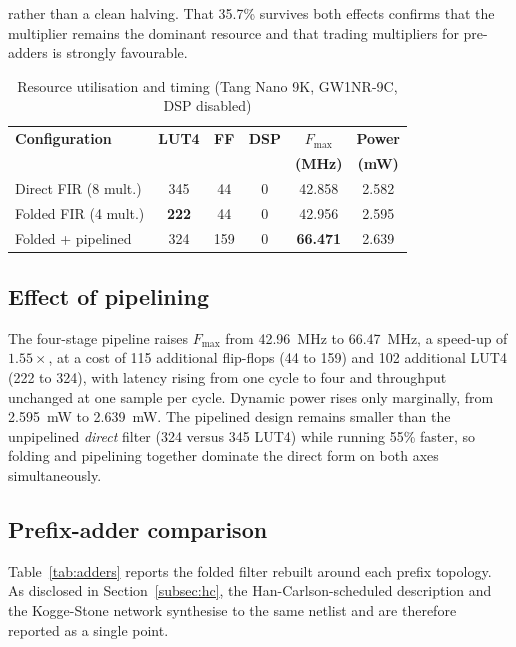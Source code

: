 \documentclass[conference]{IEEEtran}
\begin{document}
\noindent rather than a clean halving. That 35.7\% survives both effects
confirms that the multiplier remains the dominant resource and that
trading multipliers for pre-adders is strongly favourable.

\begin{table}[t]
\caption{Resource utilisation and timing (Tang Nano 9K, GW1NR-9C, DSP disabled)}
\label{tab:util}
\centering
\begin{tabular}{@{}lccccc@{}}
\toprule
\textbf{Configuration} & \textbf{LUT4} & \textbf{FF} & \textbf{DSP} &
\textbf{$F_{\max}$} & \textbf{Power} \\
 & & & & \textbf{(MHz)} & \textbf{(mW)} \\
\midrule
Direct FIR (8 mult.)    & 345 & 44  & 0 & 42.858 & 2.582 \\
Folded FIR (4 mult.)    & \textbf{222} & 44  & 0 & 42.956 & 2.595 \\
Folded + pipelined      & 324 & 159 & 0 & \textbf{66.471} & 2.639 \\
\bottomrule
\end{tabular}
\end{table}

\subsection{Effect of pipelining}

The four-stage pipeline raises $F_{\max}$ from 42.96~MHz to 66.47~MHz, a
speed-up of $\mathbf{1.55\times}$, at a cost of 115 additional
flip-flops (44 to 159) and 102 additional LUT4 (222 to 324), with
latency rising from one cycle to four and throughput unchanged at one
sample per cycle. Dynamic power rises only marginally, from 2.595~mW to
2.639~mW. The pipelined design remains smaller than the unpipelined
\emph{direct} filter (324 versus 345 LUT4) while running 55\% faster,
so folding and pipelining together dominate the direct form on both
axes simultaneously.

\subsection{Prefix-adder comparison}

Table~\ref{tab:adders} reports the folded filter rebuilt around each
prefix topology. As disclosed in Section~\ref{subsec:hc}, the
Han-Carlson-scheduled description and the Kogge-Stone network synthesise
to the same netlist and are therefore reported as a single point.
\end{document}
